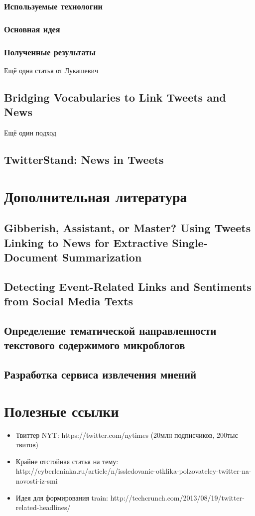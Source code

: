 \documentclass[12pt,a4paper,oneside]{extarticle}
\begin{document}
        \subsubsection{Используемые технологии}

        \subsubsection{Основная идея}

        \subsubsection{Полученные результаты}

        Ещё одна статья от Лукашевич
    \subsection{Bridging Vocabularies to Link Tweets and News}
        Ещё один подход
    \subsection{TwitterStand: News in Tweets}

\section{Дополнительная литература}
    \subsection{Gibberish, Assistant, or Master? Using Tweets Linking to News for Extractive Single-Document Summarization}
    \subsection{Detecting Event-Related Links and Sentiments from Social Media Texts}
    \subsection{Определение тематической направленности текстового содержимого микроблогов}
    \subsection{Разработка сервиса извлечения мнений}
    

\section{Полезные ссылки}
    \begin{itemize}
        \item Твиттер NYT: https://twitter.com/nytimes (20млн подписчиков, 200тыс твитов)
        \item Крайне отстойная статья на тему: http://cyberleninka.ru/article/n/issledovanie-otklika-polzovateley-twitter-na-novosti-iz-smi
        \item Идея для формирования train: http://techcrunch.com/2013/08/19/twitter-related-headlines/
    \end{itemize}
\clearpage
\end{document}
